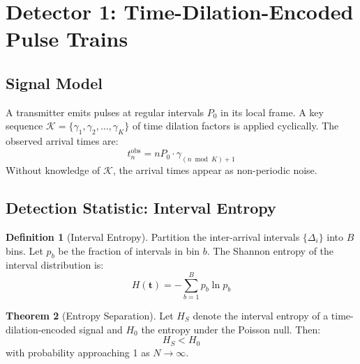 \documentclass[11pt]{article}
\theoremstyle{definition}
\newtheorem{theorem}{Theorem}[section]
\newtheorem{definition}[theorem]{Definition}
\begin{document}
\section{Detector 1: Time-Dilation-Encoded Pulse Trains}

\subsection{Signal Model}

A transmitter emits pulses at regular intervals $P_0$ in its local frame. A key sequence $\mathcal{K} = \{\gamma_1, \gamma_2, \ldots, \gamma_K\}$ of time dilation factors is applied cyclically. The observed arrival times are:
\begin{equation}
t_n^{\text{obs}} = n P_0 \cdot \gamma_{(n \bmod K) + 1}
\end{equation}
Without knowledge of $\mathcal{K}$, the arrival times appear as non-periodic noise.

\subsection{Detection Statistic: Interval Entropy}

\begin{definition}[Interval Entropy]
Partition the inter-arrival intervals $\{\Delta_i\}$ into $B$ bins. Let $p_b$ be the fraction of intervals in bin $b$. The Shannon entropy of the interval distribution is:
\begin{equation}
H(\mathbf{t}) = -\sum_{b=1}^{B} p_b \ln p_b
\end{equation}
\end{definition}

\begin{theorem}[Entropy Separation]
\label{thm:entropy}
Let $H_S$ denote the interval entropy of a time-dilation-encoded signal and $H_0$ the entropy under the Poisson null. Then:
\begin{equation}
H_S < H_0
\end{equation}
with probability approaching 1 as $N \to \infty$.
\end{theorem}
\end{document}
